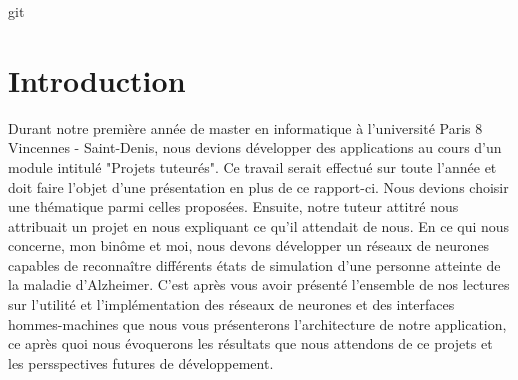 git\part*{Introduction}

 Durant notre première année de master en informatique à l'université Paris 8 Vincennes - Saint-Denis, nous devions développer des applications au cours d'un module intitulé "Projets tuteurés".
 Ce travail serait effectué sur toute l'année et doit faire l'objet d'une présentation en plus de ce rapport-ci. Nous devions choisir une thématique parmi celles proposées.
 Ensuite, notre tuteur attitré nous attribuait un projet en nous expliquant ce qu'il attendait de nous. En ce qui nous concerne, mon binôme et moi, nous devons développer un réseaux de neurones capables de reconnaître différents états de simulation d'une personne atteinte de la maladie d'Alzheimer.
 C'est après vous avoir présenté l'ensemble de nos lectures sur l'utilité et l'implémentation des réseaux de neurones et des interfaces hommes-machines que nous vous présenterons l'architecture de notre application, ce après quoi nous évoquerons les résultats que nous attendons de ce projets et les persspectives futures de développement.